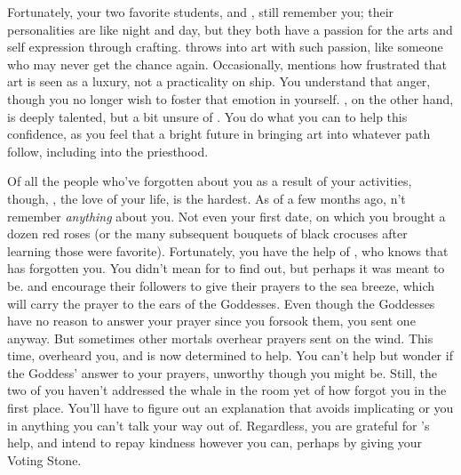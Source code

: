 \documentclass[char]{GL2020}
\begin{document}
Fortunately, your two favorite students, \cPirateChild{\full} and \cInitiate{\full}, still remember you; their personalities are like night and day, but they both have a passion for the arts and self expression through crafting. \cPirateChild{} throws \cPirateChild{\themself} into art with such passion, like someone who may never get the chance again. Occasionally, \cPirateChild{} mentions how frustrated \cPirateChild{\theyare} that art is seen as a luxury, not a practicality on \cPirateChild{\their} ship. You understand that anger, though you no longer wish to foster that emotion in yourself. \cInitiate{}, on the other hand, is deeply talented, but a bit unsure of \cInitiate{\themself}. You do what you can to help this confidence, as you feel that \cInitiate{\they} \cInitiate{\have} a bright future in bringing art into whatever path \cInitiate{\they} follow, including into the priesthood.

Of all the people who've forgotten about you as a result of your activities, though, \cHeadScientist{}, the love of your life, is the hardest. As of a few months ago, \cHeadScientist{\theydo}n't remember \emph{anything} about you. Not even your first date, on which you brought \cHeadScientist{\them} a dozen red roses (or the many subsequent bouquets of black crocuses after learning those were \cHeadScientist{\their} favorite). Fortunately, you have the help of \cInitiate{}, who knows that \cHeadScientist{} has forgotten you. You didn't mean for \cInitiate{} to find out, but perhaps it was meant to be. \cEbb{} and \cFlow{} encourage their followers to give their prayers to the sea breeze, which will carry the prayer to the ears of the Goddesses. Even though the Goddesses have no reason to answer your prayer since you forsook them, you sent one anyway. But sometimes other mortals overhear prayers sent on the wind. This time, \cInitiate{} overheard you, and is now determined to help. You can't help but wonder if \cInitiate{\theyare} the Goddess' answer to your prayers, unworthy though you might be. Still, the two of you haven't addressed the whale in the room yet of how \cHeadScientist{} forgot you in the first place. You'll have to figure out an explanation that avoids implicating \cHeadScientist{} or you in anything you can't talk your way out of. Regardless, you are grateful for \cInitiate{}'s help, and intend to repay \cInitiate{\their} kindness however you can, perhaps by giving \cInitiate{\them} your Voting Stone.
\end{document}
